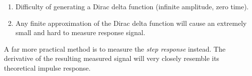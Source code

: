 \begin{enumerate}
    \item Difficulty of generating a Dirac delta function (infinite amplitude, zero time).
    \item Any finite approximation of the Dirac delta function will cause an extremely small and hard to measure response signal.
\end{enumerate}

A far more practical method is  to  measure  the \textit{step response} instead.
The derivative of the resulting measured signal will  very  closely resemble its
theoretical impulse response.








